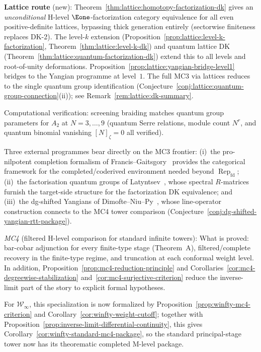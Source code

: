 \begin{remark}
\textbf{Lattice route} (new):
Theorem~\ref{thm:lattice:homotopy-factorization-dk} gives an
\emph{unconditional} H-level $\Eone$-factorization category
equivalence for all even positive-definite lattices, bypassing
thick generation entirely (sectorwise finiteness replaces DK-2).
The level-$k$ extension
(Proposition~\ref{prop:lattice:level-k-factorization},
Theorem~\ref{thm:lattice:level-k-dk}) and quantum lattice DK
(Theorem~\ref{thm:lattice:quantum-factorization-dk}) extend this
to all levels and root-of-unity deformations.
Proposition~\ref{prop:lattice:yangian-bridge-level1} bridges to
the Yangian programme at level~$1$.  The full MC3 via lattices
reduces to the single quantum group identification
(Conjecture~\ref{conj:lattice:quantum-group-connection}(ii));
see Remark~\ref{rem:lattice:dk-summary}.

Computational verification: screening braiding matches quantum group
parameters for $A_2$ at $N = 3, \ldots, 9$ (quantum Serre relations,
module count $N^r$, and quantum binomial vanishing $[N]_\zeta = 0$
all verified).

Three external programmes bear directly on the MC3 frontier:
(i)~the pro-nilpotent completion formalism of
Francis--Gaitsgory~\cite{FG12} provides the categorical framework for
the completed/coderived environment needed beyond
$\operatorname{Rep}_{\mathrm{fd}}$;
(ii)~the factorisation quantum groups of
Latyntsev~\cite{Latyntsev23}, whose spectral $R$-matrices furnish the
target-side structure for the factorization DK equivalence; and
(iii)~the dg-shifted Yangians of
Dimofte--Niu--Py~\cite{DNP25}, whose line-operator construction
connects to the MC4 tower comparison
(Conjecture~\ref{conj:dg-shifted-yangian-rtt-package}).

\emph{MC4} (filtered H-level comparison for standard infinite towers):
What is proved: bar-cobar adjunction for every finite-type stage
(Theorem~A), filtered/complete recovery in the finite-type regime, and
truncation at each conformal weight level.  In addition,
Proposition~\ref{prop:mc4-reduction-principle} and
Corollaries~\ref{cor:mc4-degreewise-stabilization}
and~\ref{cor:mc4-surjective-criterion} reduce the inverse-limit part of
the story to explicit formal hypotheses.

For $\mathcal{W}_\infty$, this specialization is now formalized by
Proposition~\ref{prop:winfty-mc4-criterion} and
Corollary~\ref{cor:winfty-weight-cutoff}; together with
Proposition~\ref{prop:inverse-limit-differential-continuity}, this
gives Corollary~\ref{cor:winfty-standard-mc4-package}, so the standard
principal-stage tower now has its theorematic completed M-level
package.


\end{remark}
